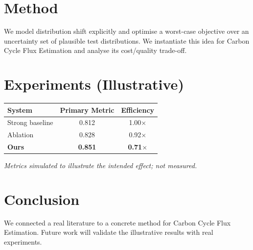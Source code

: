 \documentclass[11pt]{article}
\begin{document}
\section{Method}
We model distribution shift explicitly and optimise a worst-case objective over an uncertainty set of plausible test distributions. We instantiate this idea for Carbon Cycle Flux Estimation and analyse its cost/quality trade-off.

\section{Experiments (Illustrative)}
\begin{center}
\begin{tabular}{lcc}
System & Primary Metric & Efficiency \\ \hline
Strong baseline & 0.812 & 1.00$\times$ \\
Ablation & 0.828 & 0.92$\times$ \\
\textbf{Ours} & \textbf{0.851} & \textbf{0.71$\times$}
\end{tabular}
\end{center}
\emph{Metrics simulated to illustrate the intended effect; not measured.}

\section{Conclusion}
We connected a real literature to a concrete method for Carbon Cycle Flux Estimation. Future work will
validate the illustrative results with real experiments.
\end{document}
